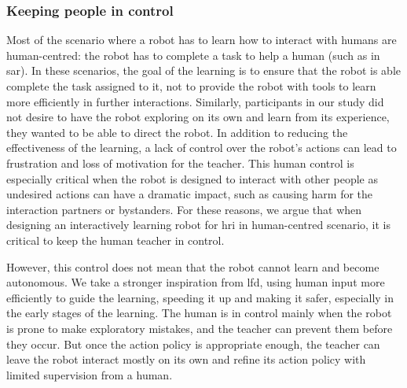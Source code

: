 \subsubsection{Keeping people in control}

Most of the scenario where a robot has to learn how to interact with humans are human-centred: the robot has to complete a task to help a human (such as in \gls{sar}). In these scenarios, the goal of the learning is to ensure that the robot is able complete the task assigned to it, not to provide the robot with tools to learn more efficiently in further interactions. Similarly, participants in our study did not desire to have the robot exploring on its own and learn from its experience, they wanted to be able to direct the robot. In addition to reducing the effectiveness of the learning, a lack of control over the robot's actions can lead to frustration and loss of motivation for the teacher. This human control is especially critical when the robot is designed to interact with other people as undesired actions can have a dramatic impact, such as causing harm for the interaction partners or bystanders. For these reasons, we argue that when designing an interactively learning robot for \gls{hri} in human-centred scenario, it is critical to keep the human teacher in control. 

However, this control does not mean that the robot cannot learn and become autonomous. We take a stronger inspiration from \gls{lfd}, using human input more efficiently to guide the learning, speeding it up and making it safer, especially in the early stages of the learning. The human is in control mainly when the robot is prone to make exploratory mistakes, and the teacher can prevent them before they occur. But once the action policy is appropriate enough, the teacher can leave the robot interact mostly on its own and refine its action policy with limited supervision from a human.



